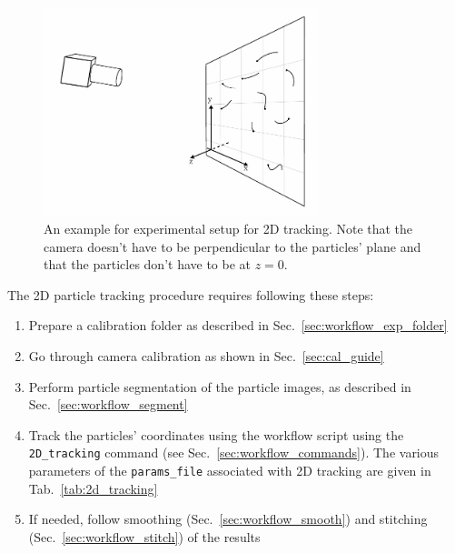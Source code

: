 \documentclass[10pt,a4paper]{article}
\begin{document}
\begin{figure}
	\centering
	\includegraphics[width=8cm]{2D_tracking_setup.pdf}
	\caption{An example for experimental setup for 2D tracking. Note that the camera doesn't have to be perpendicular to the particles' plane and that the particles don't have to be at $z=0$. \label{fig:2D_tracking}}
\end{figure}


The 2D particle tracking procedure requires following these steps:
%
\begin{enumerate}
	\item Prepare a calibration folder as described in Sec.~\ref{sec:workflow_exp_folder}
	\item Go through camera calibration as shown in Sec.~\ref{sec:cal_guide}
	\item Perform particle segmentation of the particle images, as described in Sec.~\ref{sec:workflow_segment}
	\item Track the particles' coordinates using the workflow script using the \texttt{2D\_tracking} command (see Sec.~\ref{sec:workflow_commands}). The various parameters of the \texttt{params\_file} associated with 2D tracking are given in Tab.~\ref{tab:2d_tracking}
	\item If needed, follow smoothing (Sec.~\ref{sec:workflow_smooth}) and stitching (Sec.~\ref{sec:workflow_stitch}) of the results
\end{enumerate}
%
\end{document}
